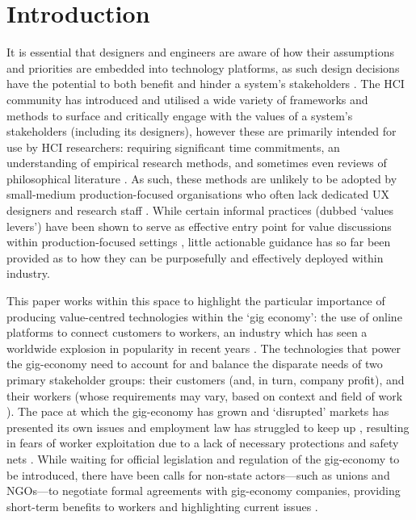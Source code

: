 \section{Introduction}
It is essential that designers and engineers are aware of how their assumptions and priorities are embedded into technology platforms, as such design decisions have the potential to both benefit and hinder a system's stakeholders \cite{winner1980}. The HCI community has introduced and utilised a wide variety of frameworks and methods to surface and critically engage with the values of a system's stakeholders (including its designers), however these are primarily intended for use by HCI researchers: requiring significant time commitments, an understanding of empirical research methods, and sometimes even reviews of philosophical literature \cite{friedman2006, flanagan2014, Alshehri2020, shilton2018}. As such, these methods are unlikely to be adopted by small-medium production-focused organisations who often lack dedicated UX designers and research staff \cite{Shilton2013, Ardito2014}. While certain informal practices (dubbed `values levers') have been shown to serve as effective entry point for value discussions within production-focused settings \cite{Shilton2013, shilton2018, shilton2019}, little actionable guidance has so far been provided as to how they can be purposefully and effectively deployed within industry.

This paper works within this space to highlight the particular importance of producing value-centred technologies within the `gig economy': the use of online platforms to connect customers to workers, an industry which has seen a worldwide explosion in popularity in recent years \cite{Taylor2017, islam2019, Wood2019}. The technologies that power the gig-economy need to account for and balance the disparate needs of two primary stakeholder groups: their customers (and, in turn, company profit), and their workers (whose requirements may vary, based on context and field of work \cite{carlos2021}). The pace at which the gig-economy has grown and `disrupted' markets has presented its own issues and employment law has struggled to keep up \cite{Minter2017}, resulting in fears of worker exploitation due to a lack of necessary protections and safety nets \cite{Balaram2017}. While waiting for official legislation and regulation of the gig-economy to be introduced, there have been calls for non-state actors---such as unions and NGOs---to negotiate formal agreements with gig-economy companies, providing short-term benefits to workers and highlighting current issues \cite{Minter2017}. 


